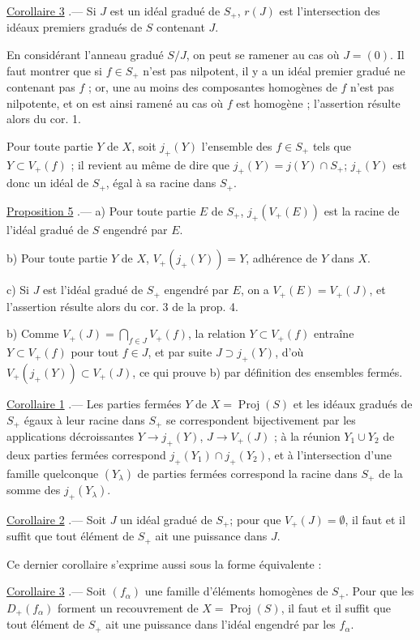 \newpage


\noindent \underline{Corollaire 3} .— Si $J$ est un idéal gradué de $S_+$, $r(J)$ est l'intersection des idéaux premiers gradués de $S$ contenant $J$.

En considérant l'anneau gradué $S/J$, on peut se ramener au cas où $J=(0)$. Il faut montrer que si $f \in S_+$ n'est pas nilpotent, il y a un idéal premier gradué ne contenant pas $f$ ; or, une au moins des composantes homogènes de $f$ n'est pas nilpotente, et on est ainsi ramené au cas où $f$ est homogène ; l'assertion résulte alors du cor. 1.

Pour toute partie $Y$ de $X$, soit $j_+(Y)$ l'ensemble des $f \in S_+$ tels que $Y \subset V_+(f)$ ; il revient au même de dire que $j_+(Y)=j(Y) \cap S_+$; $j_+(Y)$ est donc un idéal de $S_+$, égal à sa racine dans $S_+$.

\underline{Proposition 5} .— a) Pour toute partie $E$ de $S_+$, $j_+(V_+(E))$ est la racine de l'idéal gradué de $S$ engendré par $E$.

b) Pour toute partie $Y$ de $X$, $V_+(j_+(Y))=Y$, adhérence de $Y$ dans $X$.

c) Si $J$ est l'idéal gradué de $S_+$ engendré par $E$, on a $V_+(E)=V_+(J)$, et l'assertion résulte alors du cor. 3 de la prop. 4.

b) Comme $V_+(J)=\bigcap_{f \in J} V_+(f)$, la relation $Y \subset V_+(f)$ entraîne $Y \subset V_+(f)$ pour tout $f \in J$, et par suite $J \supset j_+(Y)$, d'où $V_+(j_+(Y)) \subset V_+(J)$, ce qui prouve b) par définition des ensembles fermés.

\underline{Corollaire 1} .— Les parties fermées $Y$ de $X=\operatorname{Proj}(S)$ et les idéaux gradués de $S_+$ égaux à leur racine dans $S_+$ se correspondent bijectivement par les applications décroissantes $Y \to j_+(Y)$, $J \to V_+(J)$ ; à la réunion $Y_1 \cup Y_2$ de deux parties fermées correspond $j_+(Y_1) \cap j_+(Y_2)$, et à l'intersection d'une famille quelconque $(Y_\lambda)$ de parties fermées correspond la racine dans $S_+$ de la somme des $j_+(Y_\lambda)$.

\underline{Corollaire 2} .— Soit $J$ un idéal gradué de $S_+$; pour que $V_+(J)=\emptyset$, il faut et il suffit que tout élément de $S_+$ ait une puissance dans $J$.

Ce dernier corollaire s'exprime aussi sous la forme équivalente :

\underline{Corollaire 3} .— Soit $(f_\alpha)$ une famille d'éléments homogènes de $S_+$. Pour que les $D_+(f_\alpha)$ forment un recouvrement de $X=\operatorname{Proj}(S)$, il faut et il suffit que tout élément de $S_+$ ait une puissance dans l'idéal engendré par les $f_\alpha$.

